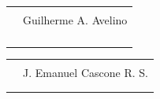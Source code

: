 \documentclass[12pt]{article}
\begin{document}



\centering
\break

\begin{tabular}{@{}p{.5in}p{4in}@{}}
& \hrulefill \\
& \centerline{Guilherme A. Avelino} \\
\\ \\ \\ \\ 
\end{tabular}

\centering
\begin{tabular}{@{}p{.5in}p{4in}@{}}
& \hrulefill \\
& \centerline{J. Emanuel Cascone R. S.} \\
\\ \\
\end{tabular}
\end{document}
